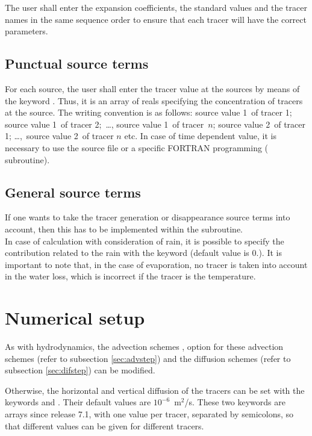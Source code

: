 The user shall enter the expansion coefficients, the standard values and the
tracer names in the same sequence order to ensure that each tracer will have
the correct parameters.

\subsection{Punctual source terms}

For each source, the user shall enter the tracer value at the sources by means
of the keyword . Thus, it is an
array of reals specifying the concentration of tracers at the source. The
writing convention is as follows: source value 1~of tracer 1; source value 1~of
tracer 2;~\dots , source value 1~of tracer~$n$; source value 2~of tracer
1; \dots ,~source value 2~of tracer $n$ etc. In case of time dependent
value, it is necessary to use the source file or a specific FORTRAN programming
( subroutine).


\subsection{General source terms}

If one wants to take the tracer generation or disappearance source terms into
account, then this has to be implemented within the 
subroutine.\\

In case of calculation with consideration of rain, it is possible to specify
the contribution related to the rain with the keyword
 (default value is 0.).
It is important to note that, in the case of evaporation,
no tracer is taken into account in the water loss,
which is incorrect if the tracer is the temperature.


\section{Numerical setup}

As with hydrodynamics, the advection schemes , option for these advection schemes
(refer to subsection \ref{sec:advstep}) and the diffusion schemes
 (refer to subsection
\ref{sec:difstep}) can be modified.

Otherwise, the horizontal and vertical diffusion of the tracers can be set with
the keywords  and
. Their default values
are $10^{-6}$~m${}^{2}$/s.
These two keywords are arrays since release 7.1, with one value per tracer,
separated by semicolons, so that different values can be given for different
tracers.


